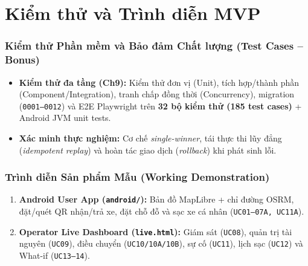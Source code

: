 \section{Kiểm thử và Trình diễn MVP}

\begin{frame}
\frametitle{Kiểm thử Phần mềm và Bảo đảm Chất lượng (Test Cases -- Bonus)}
\begin{itemize}
    \item \textbf{Kiểm thử đa tầng (Ch9):} Kiểm thử đơn vị (Unit), tích hợp/thành phần (Component/Integration), tranh chấp đồng thời (Concurrency), migration (\texttt{0001--0012}) và E2E Playwright trên \textbf{32 bộ kiểm thử (185 test cases)} + Android JVM unit tests.
    \item \textbf{Xác minh thực nghiệm:} Cơ chế \textit{single-winner}, tái thực thi lũy đẳng (\textit{idempotent replay}) và hoàn tác giao dịch (\textit{rollback}) khi phát sinh lỗi.
\end{itemize}
\end{frame}

\begin{frame}
\frametitle{Trình diễn Sản phẩm Mẫu (Working Demonstration)}
\begin{enumerate}
    \item \textbf{Android User App (\texttt{android/}):} Bản đồ MapLibre + chỉ đường OSRM, đặt/quét QR nhận/trả xe, đặt chỗ đỗ và sạc xe cá nhân (\texttt{UC01--07A, UC11A}).
    \item \textbf{Operator Live Dashboard (\texttt{live.html}):} Giám sát (\texttt{UC08}), quản trị tài nguyên (\texttt{UC09}), điều chuyển (\texttt{UC10/10A/10B}), sự cố (\texttt{UC11}), lịch sạc (\texttt{UC12}) và What-if (\texttt{UC13--14}).
\end{enumerate}
\end{frame}
